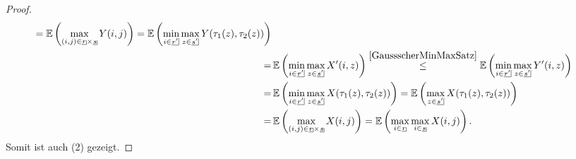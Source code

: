 \begin{proof}
\begin{align*}
= \E\left(\max_{(i, j) \in \haken r \times \haken s} Y(i,j) \right)
= \E\left(\min_{i\in \haken {r'}}\max_{z \in \haken {s'}}
Y(\tau_1(z), \tau_2(z))\right)\\
= &\, \E\left(\min_{i\in \haken {r'}}\max_{z \in \haken {s'}}
X'(i, z)\right)
\overset{\ref{GaussscherMinMaxSatz}}\le
\E\left(\min_{i\in \haken {r'}}\max_{z \in \haken {s'}}
Y'(i, z)\right)\\
=&\,\E\left(\min_{i\in \haken {r'}}\max_{z \in \haken {s'}}
X(\tau_1(z), \tau_2(z)) \right)
=\E\left(\max_{z \in \haken {s'}}X(\tau_1(z), \tau_2(z)) \right)\\
= & \, \E\left(\max_{(i,j) \in \haken r \times \haken s} X(i,j) \right)
= \E\left(\max_{i \in \haken r}\max_{i \in \haken s} X(i,j) \right)\text.
\end{align*}
Somit ist auch (2) gezeigt.
\end{proof}